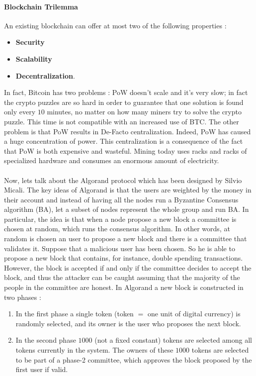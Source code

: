 \paragraph{Blockchain Trilemma} An existing blockchain can offer at most two of the following properties :
\begin{itemize}
\item \textbf{Security}
\item \textbf{Scalability}
\item \textbf{Decentralization}.
\end{itemize}
In fact, Bitcoin has two problems : PoW doesn't scale and it's very slow; in fact the crypto puzzles are so hard in order to guarantee that one solution is found only every $10$ minutes, no matter on how many miners try to solve the crypto puzzle. This time is not compatible with an increased use of BTC. The other problem is that PoW results in De-Facto centralization. Indeed, PoW has caused a huge concentration of power. This centralization is a consequence of the fact that PoW is both expensive and wasteful. Mining today uses racks and racks of specialized hardware and consumes an enormous amount of electricity.\\\\Now, lets talk about the Algorand protocol which has been designed by Silvio Micali. The key ideas of Algorand is that the users are weighted by the money in their account and instead of having all the nodes run a Byzantine Consensus algorithm (BA), let a subset of nodes represent the whole group and run BA. In particular, the idea is that when a node propose a new block a committee is chosen at random, which runs the consensus algorithm. In other words, at random is chosen an user to propose a new block and there is a committee that validates it. Suppose that a malicious user has been chosen. So he is able to propose a new block that contains, for instance, double spending transactions. However, the block is accepted if and only if the committee decides to accept the block, and thus the attacker can be caught assuming that the majority of the people in the committee are honest. In Algorand a new block is constructed in two phases :
\begin{enumerate}
\item In the first phase a single token (token $=$ one unit of digital currency) is randomly selected, and its owner is the user who proposes the next block.
\item In the second phase $1000$ (not a fixed constant) tokens are selected among all tokens currently in the system. The owners of these $1000$ tokens are selected to be part of a phase-2 committee, which approves the block proposed by the first user if valid.
\end{enumerate}
